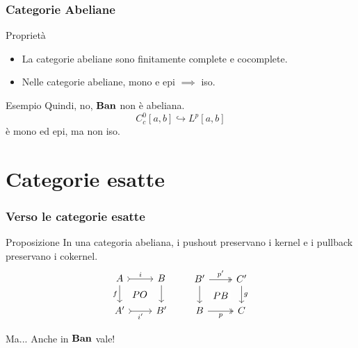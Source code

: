 \documentclass{beamer}
\begin{document}
\begin{frame}
  \frametitle{Categorie Abeliane}

  \begin{block}{Proprietà}
    \begin{itemize}
    \item La categorie abeliane sono finitamente complete e cocomplete.
    \item Nelle categorie abeliane, mono e epi \(\implies\) iso.
    \end{itemize}
  \end{block}

  \pause
  
  \begin{block}{Esempio}
    Quindi, no, \(\mathbf{Ban}\) \alert{non} è abeliana.
    \[
      C_c^0[a, b] \hookrightarrow L^p[a, b]
    \]
    è mono ed epi, ma non iso.
  \end{block}
  
\end{frame}



\section{Categorie esatte}

\begin{frame}[fragile]
  \frametitle{Verso le categorie esatte}

  \begin{block}{Proposizione}
    In una categoria abeliana, i pushout preservano i kernel e i pullback
    preservano i cokernel.
    \[
      \begin{tikzcd}
        A \ar["{f}", d, swap] \ar["{PO}" description, phantom, dr] \ar["{i}", rightarrowtail, r] & B \ar["{}", d] \\
        A' \ar["{i'}", rightarrowtail, r, swap] & B'
      \end{tikzcd}
      \qquad
            \begin{tikzcd}
        B' \ar["{}", d] \ar["{PB}" description, dr, phantom] \ar["{p'}", twoheadrightarrow, r] & C' \ar["{g}", d] \\
        B \ar["{p}", twoheadrightarrow, r, swap] & C
      \end{tikzcd}
    \]
  \end{block}

  \pause
  
  \begin{block}{Ma...}
    Anche in \(\mathbf{Ban}\) vale!
  \end{block}
  
\end{frame}
\end{document}
